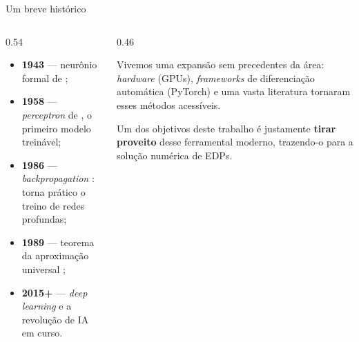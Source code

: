 \begin{frame}{Um breve histórico}
  \begin{columns}[T,totalwidth=\textwidth]
    \begin{column}{0.54\textwidth}
      \begin{itemize}
        \item \textbf{1943} --- neurônio formal de \textcite{mcculloch1943};
        \item \textbf{1958} --- \emph{perceptron} de \textcite{rosenblatt1958}, o primeiro
              modelo treinável;
        \item \textbf{1986} --- \emph{backpropagation} \parencite{rumelhart1986}: torna
              prático o treino de redes profundas;
        \item \textbf{1989} --- teorema da aproximação universal
              \parencite{cybenko1989,hornik1989};
        \item \textbf{2015+} --- \emph{deep learning} \parencite{lecun2015deep} e a
              revolução de IA em curso.
      \end{itemize}
    \end{column}
    \begin{column}{0.46\textwidth}
      \begin{information}
        Vivemos uma \alert{expansão sem precedentes} da área: \emph{hardware} (GPUs),
        \emph{frameworks} de diferenciação automática (PyTorch) e uma vasta literatura
        tornaram esses métodos acessíveis.
      \end{information}
      \vspace{0.2cm}
      \begin{remark}
        Um dos objetivos deste trabalho é justamente \textbf{tirar proveito} desse
        ferramental moderno, trazendo-o para a solução numérica de EDPs.
      \end{remark}
    \end{column}
  \end{columns}
\end{frame}

